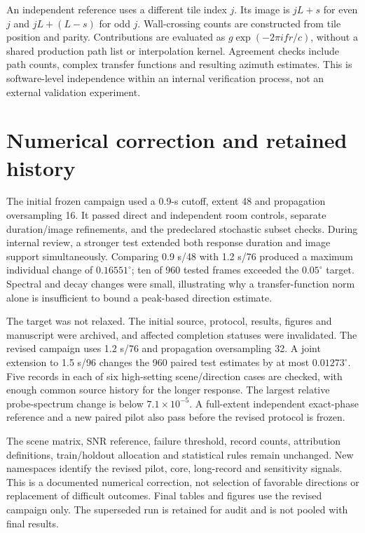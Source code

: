 \documentclass[10pt,a4paper]{article}
\begin{document}
An independent reference uses a different tile index $j$. Its image is $jL+s$ for even $j$ and $jL+(L-s)$ for odd $j$. Wall-crossing counts are constructed from tile position and parity. Contributions are evaluated as $g\exp(-2\pi i f r/c)$, without a shared production path list or interpolation kernel. Agreement checks include path counts, complex transfer functions and resulting azimuth estimates. This is software-level independence within an internal verification process, not an external validation experiment.

\section{Numerical correction and retained history}
The initial frozen campaign used a 0.9-s cutoff, extent 48 and propagation oversampling 16. It passed direct and independent room controls, separate duration/image refinements, and the predeclared stochastic subset checks. During internal review, a stronger test extended both response duration and image support simultaneously. Comparing 0.9 s/48 with 1.2 s/76 produced a maximum individual change of $0.16551^\circ$; ten of 960 tested frames exceeded the $0.05^\circ$ target. Spectral and decay changes were small, illustrating why a transfer-function norm alone is insufficient to bound a peak-based direction estimate.

The target was not relaxed. The initial source, protocol, results, figures and manuscript were archived, and affected completion statuses were invalidated. The revised campaign uses 1.2 s/76 and propagation oversampling 32. A joint extension to 1.5 s/96 changes the 960 paired test estimates by at most $0.01273^\circ$. Five records in each of six high-setting scene/direction cases are checked, with enough common source history for the longer response. The largest relative probe-spectrum change is below $7.1\times10^{-5}$. A full-extent independent exact-phase reference and a new paired pilot also pass before the revised protocol is frozen.

The scene matrix, SNR reference, failure threshold, record counts, attribution definitions, train/holdout allocation and statistical rules remain unchanged. New namespaces identify the revised pilot, core, long-record and sensitivity signals. This is a documented numerical correction, not selection of favorable directions or replacement of difficult outcomes. Final tables and figures use the revised campaign only. The superseded run is retained for audit and is not pooled with final results.
\end{document}

